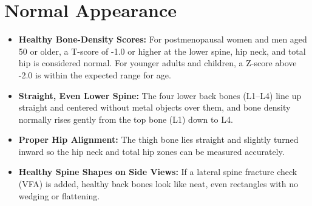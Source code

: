 \section{Normal Appearance}
\begin{itemize}
\item \textbf{Healthy Bone-Density Scores:} For postmenopausal women and men aged 50 or older, a T-score of -1.0 or higher at the lower spine, hip neck, and total hip is considered normal. For younger adults and children, a Z-score above -2.0 is within the expected range for age.
\item \textbf{Straight, Even Lower Spine:} The four lower back bones (L1--L4) line up straight and centered without metal objects over them, and bone density normally rises gently from the top bone (L1) down to L4.
\item \textbf{Proper Hip Alignment:} The thigh bone lies straight and slightly turned inward so the hip neck and total hip zones can be measured accurately.
\item \textbf{Healthy Spine Shapes on Side Views:} If a lateral spine fracture check (VFA) is added, healthy back bones look like neat, even rectangles with no wedging or flattening.
\end{itemize}

